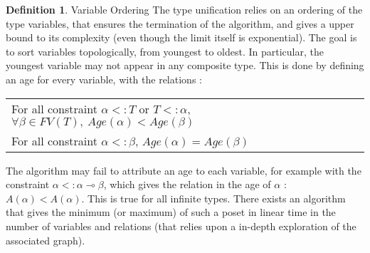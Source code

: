\documentclass[9pt]{article}
\theoremstyle{plain}
\theoremstyle{definition}
\newtheorem{defn}{Definition}[subsection] %
\begin{document}
\begin{defn}{Variable Ordering}
	The type unification relies on an ordering of the type variables, that ensures the termination of the algorithm, and gives a upper
	bound to its complexity (even though the limit itself is exponential).
	The goal is to sort variables topologically, from youngest to oldest. In particular,
  the youngest variable may not appear in any composite type. This is done by defining an age for every variable, with the
  relations :
  	\begin{center}
  	\begin{tabular}{l}
  	  For all constraint $\alpha <: T$ or $T <: \alpha$, $\forall \beta \in FV(T), ~ Age (\alpha) < Age (\beta)$ \\
  	  For all constraint $\alpha <: \beta$, $Age (\alpha) = Age (\beta)$
  	\end{tabular}
  	\end{center}
  	The algorithm may fail to attribute an age to each variable, for example with the constraint $\alpha <: \alpha \multimap \beta$, which gives the
  	relation in the age of $\alpha$ : $A(\alpha) < A(\alpha)$. This is true for all infinite types.
  	There exists an algorithm that gives the minimum (or maximum) of such a poset in linear time in the number of variables and relations
  	(that relies upon a in-depth exploration of the associated graph).
\end{defn}
\end{document}
